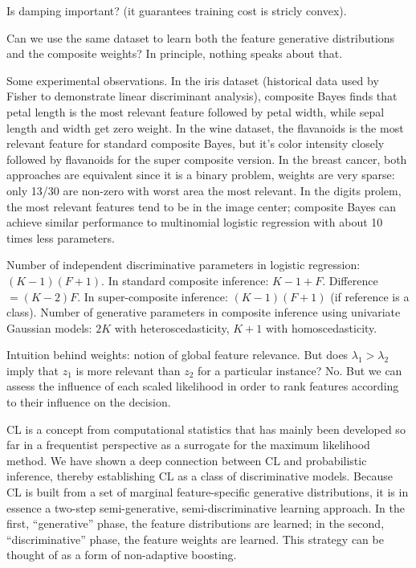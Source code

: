 \documentclass[english]{scrartcl}
\begin{document}
{\color{red} Is damping important? (it guarantees training cost is stricly convex).}

{\color{red} Can we use the same dataset to learn both the feature generative distributions and the composite weights? In principle, nothing speaks about that.} 


Some experimental observations. In the iris dataset (historical data used by Fisher to demonstrate linear discriminant analysis), composite Bayes finds that petal length is the most relevant feature followed by petal width, while sepal length and width get zero weight. In the wine dataset, the flavanoids is the most relevant feature for standard composite Bayes, but it's color intensity closely followed by flavanoids for the super composite version. In the breast cancer, both approaches are equivalent since it is a binary problem, weights are very sparse: only 13/30 are non-zero with worst area the most relevant. In the digits prolem, the most relevant features tend to be in the image center; composite Bayes can achieve similar performance to multinomial logistic regression with about 10 times less parameters.

Number of independent discriminative parameters in logistic regression: $(K-1)(F+1)$. In standard composite inference: $K-1+F$. Difference $=(K-2)F$. In super-composite inference: $(K-1)(F+1)$ (if reference is a class). Number of generative parameters in composite inference using univariate Gaussian models: $2K$ with heteroscedasticity, $K+1$ with homoscedasticity. 

Intuition behind weights: notion of global feature relevance. But does $\lambda_1>\lambda_2$ imply that $z_1$ is more relevant than $z_2$ for a particular instance? No. But we can assess the influence of each scaled likelihood in order to rank features according to their influence on the decision.

CL is a concept from computational statistics that has mainly been developed so far in a frequentist perspective as a surrogate for the maximum likelihood method. We have shown a deep connection between CL and probabilistic inference, thereby establishing CL as a class of discriminative models. Because CL is built from a set of marginal feature-specific generative distributions, it is in essence a two-step semi-generative, semi-discriminative learning approach. In the first, ``generative'' phase, the feature distributions are learned; in the second, ``discriminative'' phase, the feature weights are learned. This strategy can be thought of as a form of non-adaptive boosting.
\end{document}
